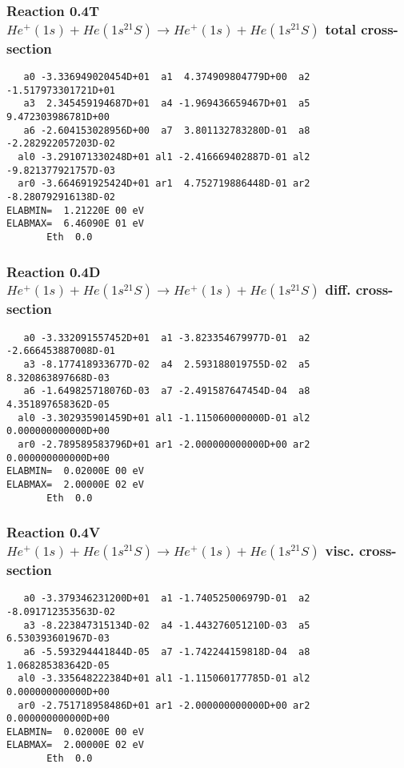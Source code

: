 \documentclass[12pt,dvipdfmx]{article}
\begin{document}
\subsubsection{
Reaction 0.4T   $  He^+(1s) + He(1s^21S) \rightarrow He^+(1s) + He(1s^21S) $  total cross-section
}



\begin{small}\begin{verbatim}
   a0 -3.336949020454D+01  a1  4.374909804779D+00  a2 -1.517973301721D+01
   a3  2.345459194687D+01  a4 -1.969436659467D+01  a5  9.472303986781D+00
   a6 -2.604153028956D+00  a7  3.801132783280D-01  a8 -2.282922057203D-02
  al0 -3.291071330248D+01 al1 -2.416669402887D-01 al2 -9.821377921757D-03
  ar0 -3.664691925424D+01 ar1  4.752719886448D-01 ar2 -8.280792916138D-02
ELABMIN=  1.21220E 00 eV
ELABMAX=  6.46090E 01 eV
       Eth  0.0
\end{verbatim}\end{small}

\subsubsection{
Reaction 0.4D    $He^+(1s) + He(1s^21S) \rightarrow He^+(1s) + He(1s^21S)$   diff. cross-section
}


\begin{small}\begin{verbatim}
   a0 -3.332091557452D+01  a1 -3.823354679977D-01  a2 -2.666453887008D-01
   a3 -8.177418933677D-02  a4  2.593188019755D-02  a5  8.320863897668D-03
   a6 -1.649825718076D-03  a7 -2.491587647454D-04  a8  4.351897658362D-05
  al0 -3.302935901459D+01 al1 -1.115060000000D-01 al2  0.000000000000D+00
  ar0 -2.789589583796D+01 ar1 -2.000000000000D+00 ar2  0.000000000000D+00
ELABMIN=  0.02000E 00 eV
ELABMAX=  2.00000E 02 eV
       Eth  0.0
\end{verbatim}\end{small}


\subsubsection{
Reaction 0.4V   $  He^+(1s) + He(1s^21S) \rightarrow He^+(1s) + He(1s^21S) $  visc. cross-section
}



\begin{small}\begin{verbatim}
   a0 -3.379346231200D+01  a1 -1.740525006979D-01  a2 -8.091712353563D-02
   a3 -8.223847315134D-02  a4 -1.443276051210D-03  a5  6.530393601967D-03
   a6 -5.593294441844D-05  a7 -1.742244159818D-04  a8  1.068285383642D-05
  al0 -3.335648222384D+01 al1 -1.115060177785D-01 al2  0.000000000000D+00
  ar0 -2.751718958486D+01 ar1 -2.000000000000D+00 ar2  0.000000000000D+00
ELABMIN=  0.02000E 00 eV
ELABMAX=  2.00000E 02 eV
       Eth  0.0
\end{verbatim}\end{small}
\end{document}
